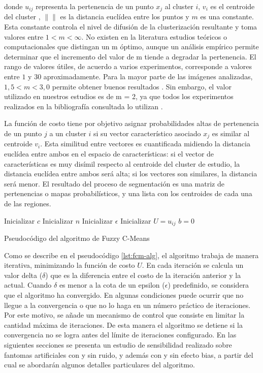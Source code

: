 donde $u_{ij}$ representa la pertenencia de un punto $x_j$ al cluster $i$, $v_i$ es el centroide del cluster , $\lVert \rVert$ es la distancia euclídea entre los puntos y $m$ es una constante. Esta constante controla el nivel de difusión de la clusterización resultante \citep{chuang2006fuzzy} y toma valores entre $1 < m < \infty$. No existen en la literatura estudios teóricos o computacionales que distingan un m óptimo, aunque un análisis empírico permite determinar que el incremento del valor de m tiende a degradar la pertenencia. El rango de valores útiles, de acuerdo a varios experimentos, corresponde a valores entre $1$ y $30$ aproximadamente. Para la mayor parte de las imágenes analizadas, $1,5 < m < 3,0$ permite obtener buenos resultados \citep{bezdek1984fcm}. Sin embargo, el valor utilizado en nuestros estudios es de m = 2, ya que todos los experimentos realizados en la bibliografía consultada lo utilizan \citep{caldairou2011non, yang2005fuzzy, chuang2006fuzzy}.

La función de costo tiene por objetivo asignar probabilidades altas de pertenencia de un punto $j$ a un cluster $i$ si su vector característico asociado $x_j$ es similar al centroide $v_i$. Esta similitud entre vectores es cuantificada midiendo la distancia euclídea entre ambos en el espacio de características: si el vector de características es muy disímil respecto al centroide del cluster de estudio, la distancia euclídea entre ambos será alta; si los vectores son similares, la distancia será menor. El resultado del proceso de segmentación es una matriz de pertenencias o mapas probabilísticos, y una lista con los centroides de cada una de las regiones.



\begin{algorithm}[H]
Inicializar $c$ 
Inicializar $n$ 
Inicializar $\epsilon$\;
Inicializar $U = u_{ij}$ 
$b = 0$\;
\caption{Pseudocódigo del algoritmo de Fuzzy C-Means}
\label{lst:fcm-alg}
\end{algorithm}


Como se describe en el pseudocódigo \ref{lst:fcm-alg}, el algoritmo trabaja de manera iterativa, minimizando la función de costo $U$. En cada iteración se calcula un valor delta ($\delta$) que es la diferencia entre el costo de la iteración anterior y la actual. Cuando $\delta$ es menor a la cota de un epsilon ($\epsilon$) predefinido, se considera que el algoritmo ha convergido. En algunas condiciones puede ocurrir que no llegue a la convergencia o que no lo haga en un número práctico de iteraciones. Por este motivo, se añade un mecanismo de control que consiste en limitar la cantidad máxima de iteraciones. De esta manera el algoritmo se detiene si la convergencia no se logra antes del límite de iteraciones configurado.
En las siguientes secciones se presenta un estudio de sensibilidad realizado sobre fantomas artificiales con y sin ruido, y además con y sin efecto bias, a partir del cual se abordarán algunos detalles particulares del algoritmo.


